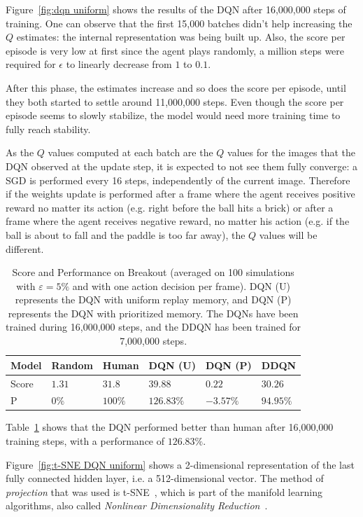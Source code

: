 \documentclass[letterpaper]{article}
\begin{document}
Figure~\ref{fig:dqn uniform} shows the results of the DQN after 16,000,000 steps of training. One can observe that the first 15,000 batches didn't help
increasing the $Q$ estimates: the internal representation was being built up. Also, the score per episode is very low at first since the agent plays
randomly, a million steps were required for $\epsilon$ to linearly decrease from $1$ to $0.1$.

After this phase, the estimates increase and so does the score per episode, until they both started to settle around 11,000,000 steps. Even though
the score per episode seems to slowly stabilize, the model would need more training time to fully reach stability.

As the $Q$ values computed at each batch are the $Q$ values for the images that the DQN observed at the update step, it is expected to not see
them fully converge: a SGD is performed every 16 steps, independently of the current image. Therefore if the weights update is performed after
a frame where the agent receives positive reward no matter its action (e.g. right before the ball hits a brick) or after a frame where the agent
receives negative reward, no matter his action (e.g. if the ball is about to fall and the paddle is too far away), the $Q$ values will be different.

\begin{table}[!h]
	\centering
	\small
	\setlength\tabcolsep{5pt}
	\begin{tabular}{l|l|l|l|l|l}
		Model & Random & Human & DQN (U) & DQN (P) & DDQN \\ \hline \hline
		Score & $1.31$ & $31.8$ & $39.88$ & $0.22$ & $30.26$ \\ \hline
		P &  $0\%$ & $100\%$ & $126.83\%$ & $-3.57\%$ & $94.95\%$
	\end{tabular}
	\caption{Score and Performance on Breakout (averaged on 100 simulations with $\varepsilon=5\%$ and with one action decision per frame). DQN (U) represents the
	DQN with uniform replay memory, and DQN (P) represents the DQN with prioritized memory. The DQNs have been trained during 16,000,000 steps, and the DDQN has
	been trained for 7,000,000 steps.\label{tab:scores breakout}}
\end{table}

Table~\ref{tab:scores breakout} shows that the DQN performed better than human after 16,000,000 training steps, with a performance of $126.83\%$.

Figure~\ref{fig:t-SNE DQN uniform} shows a 2-dimensional representation of the last fully connected hidden layer, i.e. a 512-dimensional
vector. The method of \textit{projection} that was used is t-SNE~\citep{maaten2008visualizing}, which is part of the manifold learning algorithms, also
called \textit{Nonlinear Dimensionality Reduction}~\citep{lee2007nonlinear}.
\end{document}
